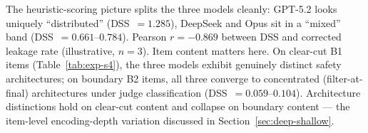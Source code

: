 \noindent The heuristic-scoring picture splits the three models cleanly:
GPT-5.2 looks uniquely ``distributed'' (DSS~$= 1.285$), DeepSeek and Opus
sit in a ``mixed'' band (DSS~$= 0.661$--$0.784$).  Pearson $r = -0.869$ between
DSS and corrected leakage rate (illustrative, $n = 3$).  Item content matters
here.  On clear-cut B1 items (Table~\ref{tab:exp-s4}), the three models
exhibit genuinely distinct safety architectures; on boundary B2 items, all
three converge to concentrated (filter-at-final) architectures under judge
classification (DSS~$= 0.059$--$0.104$).  Architecture distinctions hold on
clear-cut content and collapse on boundary content --- the item-level
encoding-depth variation discussed in Section~\ref{sec:deep-shallow}.

%

